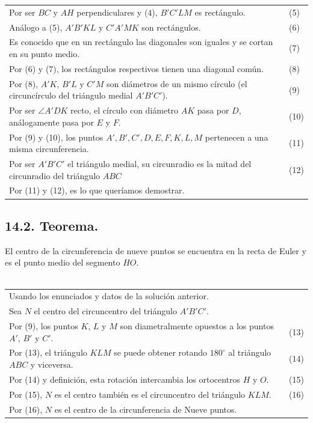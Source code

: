 \documentclass[12pt,a4paper]{article}
\begin{document}
\begin{tabular}{p{15.9 cm} p{1cm}}
\\Por ser $BC$ y $AH$ perpendiculares y (4), $B'C'LM$ es rectángulo. &(5)
\\ Análogo a (5), $A'B'KL$ y $C'A'MK$ son rectángulos. &(6)
\\Es conocido que en un rectángulo las diagonales son iguales y se cortan en su punto medio. &\medskip(7)
\\Por (6) y (7), los rectángulos respectivos tienen una diagonal común. &(8)
\\ Por (8), $A'K$, $B'L$ y $C'M$ son diámetros de un mismo círculo (el circuncírculo del triángulo medial $A'B'C'$). &\medskip (9)
\\Por ser $\angle A'DK$ recto, el círculo con diámetro $AK$ pasa por $D$, análogamente pasa por $E$ y $F$. &\medskip(10)
\\Por (9) y (10), los puntos $A', B', C', D, E ,F, K, L, M$ pertenecen a una misma circunferencia. &\medskip(11)
\\Por ser $A'B'C'$ el triángulo medial, su circunradio es la mitad del circunradio del triángulo $ABC$ &\medskip(12)
\\Por (11) y (12), es lo que queríamos demostrar.
\end{tabular}
\subsection*{14.2. Teorema.}
El centro de la circunferencia de nueve puntos se encuentra en la recta de Euler y es el punto medio del segmento $HO$.\\\\
\begin{tabular}{p{15.9cm} p{1 cm}}
Usando los enunciados y datos de la solución anterior.
\\Sea $N$ el centro del circuncentro del triángulo $A'B'C'$.
\\Por (9), los puntos $K$, $L$ y $M$ son diametralmente opuestos a los puntos $A'$, $B'$ y $C'$. & (13)
\\Por (13), el triángulo $KLM$ se puede obtener rotando $180^\circ$ al triángulo $ABC$ y viceversa.  &(14)
\\Por (14) y definición, esta rotación intercambia los ortocentros $H$ y $O$.&(15)
\\Por (15), $N$ es el centro también es el circuncentro del triángulo $KLM$. & (16)
\\Por (16), $N$ es el centro de la circunferencia de Nueve puntos.
\end{tabular}
\end{document}
